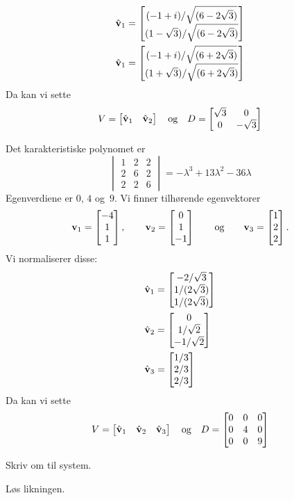 \begin{losning}
\begin{punkt}
\begin{align*}
\hat{\mathbf{v}}_1
&= \begin{bmatrix} (-1+i)/\sqrt{(6-2\sqrt{3})} \\ (1-\sqrt{3})/\sqrt{(6-2\sqrt{3})} \end{bmatrix}
\\
\hat{\mathbf{v}}_1
&= \begin{bmatrix} (-1+i)/\sqrt{(6+2\sqrt{3})} \\ (1+\sqrt{3})/\sqrt{(6+2\sqrt{3})} \end{bmatrix}
\end{align*}
Da kan vi sette
\[
V = \begin{bmatrix} \hat{\mathbf{v}}_1 & \hat{\mathbf{v}}_2 \end{bmatrix}
\quad\text{og}\quad
D =
\begin{bmatrix}
\sqrt{3} & 0         \\
0        & -\sqrt{3}
\end{bmatrix}
\]
\end{punkt}
\begin{punkt}
Det karakteristiske polynomet er
\[
\begin{vmatrix}
1 & 2 & 2\\
2 & 6 & 2\\
2 & 2 & 6
\end{vmatrix}
= -\lambda^3 + 13\lambda^2 - 36\lambda
\]
Egenverdiene er $0$, $4$ og~$9$.  Vi finner tilhørende egenvektorer
\[
\mathbf{v}_1 = \begin{bmatrix} -4 \\ 1 \\ 1 \end{bmatrix},\qquad
\mathbf{v}_2 = \begin{bmatrix} 0 \\ 1 \\ -1 \end{bmatrix}\qquad\text{og}\qquad
\mathbf{v}_3 = \begin{bmatrix} 1 \\ 2 \\ 2 \end{bmatrix}.
\]
Vi normaliserer disse:
\begin{align*}
\hat{\mathbf{v}}_1 &= \begin{bmatrix} -2/\sqrt{3} \\ 1/(2\sqrt{3}) \\ 1/(2\sqrt{3}) \end{bmatrix} \\
\hat{\mathbf{v}}_2 &= \begin{bmatrix} 0 \\ 1/\sqrt{2} \\ -1/\sqrt{2} \end{bmatrix} \\
\hat{\mathbf{v}}_3 &= \begin{bmatrix} 1/3 \\ 2/3 \\ 2/3 \end{bmatrix}
\end{align*}
Da kan vi sette
\[
V = \begin{bmatrix} \hat{\mathbf{v}}_1 & \hat{\mathbf{v}}_2 & \hat{\mathbf{v}}_3 \end{bmatrix}
\quad\text{og}\quad
D =
\begin{bmatrix}
0 & 0 & 0 \\
0 & 4 & 0 \\
0 & 0 & 9
\end{bmatrix}
\]
\end{punkt}
\end{losning}



\begin{oppgave}
Skriv om til system.
\end{oppgave}

\begin{oppgave}
Løs likningen.
\end{oppgave}

